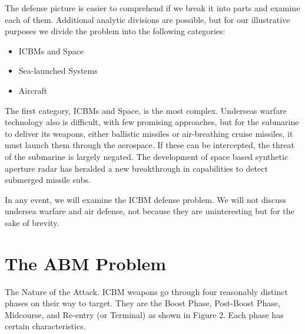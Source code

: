 The defense picture is easier to comprehend if we break it into parts and examine each of them. Additional analytic divisions are possible, but for our illustrative purposes we divide the problem into the following categories:
\begin{itemize}
    \item ICBMs and Space
    \item Sea-launched Systems
    \item Aircraft
\end{itemize}

The first category, ICBMs and Space, is the most complex. Underseas warfare technology also is difficult, with few promising approaches, but for the submarine to deliver its weapons, either ballistic missiles or air-breathing cruise missiles, it must launch them through the aerospace. If these can be intercepted, the threat of the submarine is largely negated. The development of space based synthetic aperture radar has heralded a new breakthrough in capabilities to detect submerged missile subs.

In any event, we will examine the ICBM defense problem. We will not discuss undersea warfare and air defense, not because they are uninteresting but for the sake of brevity.

\section{The ABM Problem}
The Nature of the Attack. ICBM weapons go through four reasonably distinct phases on their way to target. They are the Boost Phase, Post-Boost Phase, Midcourse, and Re-entry (or Terminal) as shown in Figure 2. Each phase has certain characteristics.

